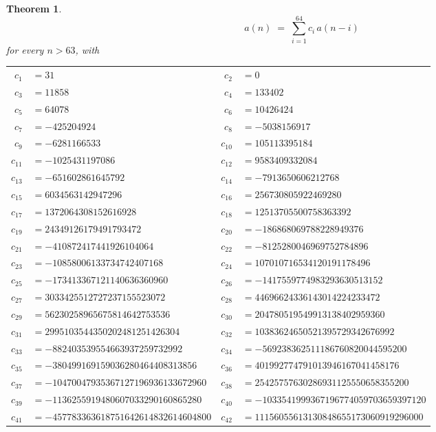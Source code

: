 \documentclass[11pt,a4paper]{article}
\theoremstyle{plain}
\newtheorem{theorem}{Theorem}
\theoremstyle{definition}
\begin{document}
\begin{theorem}
\[
a(n)\;=\;\sum_{i=1}^{64}c_i\,a(n-i)
\]
for every $n>63$, with
\begin{center}\footnotesize
\begin{tabular}{r@{\,}l@{\qquad}r@{\,}l}
$c_{1}$ & $=31$ & $c_{2}$ & $=0$ \\
$c_{3}$ & $=11858$ & $c_{4}$ & $=133402$ \\
$c_{5}$ & $=64078$ & $c_{6}$ & $=10426424$ \\
$c_{7}$ & $=-425204924$ & $c_{8}$ & $=-5038156917$ \\
$c_{9}$ & $=-6281166533$ & $c_{10}$ & $=105113395184$ \\
$c_{11}$ & $=-1025431197086$ & $c_{12}$ & $=9583409332084$ \\
$c_{13}$ & $=-651602861645792$ & $c_{14}$ & $=-7913650606212768$ \\
$c_{15}$ & $=6034563142947296$ & $c_{16}$ & $=256730805922469280$ \\
$c_{17}$ & $=1372064308152616928$ & $c_{18}$ & $=12513705500758363392$ \\
$c_{19}$ & $=24349126179491793472$ & $c_{20}$ & $=-186868069788228949376$ \\
$c_{21}$ & $=-410872417441926104064$ & $c_{22}$ & $=-8125280046969752784896$ \\
$c_{23}$ & $=-10858006133734742407168$ & $c_{24}$ & $=107010716534120191178496$ \\
$c_{25}$ & $=-173413367121140636360960$ & $c_{26}$ & $=-1417559774983293630513152$ \\
$c_{27}$ & $=3033425512727237155523072$ & $c_{28}$ & $=44696624336143014224233472$ \\
$c_{29}$ & $=56230258965675814642753536$ & $c_{30}$ & $=204780519549913138402959360$ \\
$c_{31}$ & $=2995103544350202481251426304$ & $c_{32}$ & $=10383624650521395729342676992$ \\
$c_{33}$ & $=-882403539554663937259732992$ & $c_{34}$ & $=-569238362511186760820044595200$ \\
$c_{35}$ & $=-380499169159036280464408313856$ & $c_{36}$ & $=401992774791013946167041458176$ \\
$c_{37}$ & $=-10470047935367127196936133672960$ & $c_{38}$ & $=25425757630286931125550658355200$ \\
$c_{39}$ & $=-1136255919480607033290160865280$ & $c_{40}$ & $=-1033541999367196774059703659397120$ \\
$c_{41}$ & $=-457783363618751642614832614604800$ & $c_{42}$ & $=11156055613130848655173060919296000$ \\

\end{tabular}
\end{center}
\end{theorem}
\end{document}
